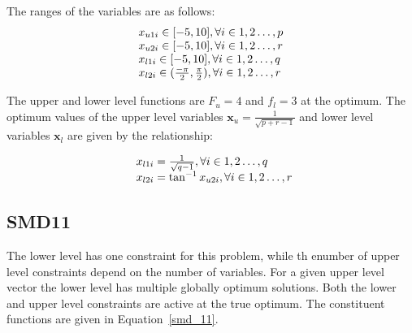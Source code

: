 The ranges of the variables are as follows:
\begin{equation}
\begin{array}{lr}
$$x_{u1i} \in  [-5,10],          \forall i \in {1,2\ldots,p}$$\\
$$x_{u2i} \in  [-5,10],          \forall i \in {1,2\ldots,r}$$\\
$$x_{l1i} \in  [-5,10],          \forall i \in {1,2\ldots,q}$$\\
$$x_{l2i} \in  (\frac{-\pi}{2},\frac{\pi}{2}),          \forall i \in {1,2\ldots,r}$$
\end{array}
\label{smd_10}
\end{equation}



The upper and lower level functions are $F_u=4$ and $f_l=3$  at the optimum. The optimum values of the upper level variables $\mathbf{x}_u=\frac{1}{\sqrt{p+r-1}}$ and lower level variables $\mathbf{x}_l$ are given by the relationship: 

\begin{equation}
\begin{array}{lr}
\text{}\hspace{2mm} x_{l1i}=\frac{1}{\sqrt{q-1}},  \forall i \in {1,2\ldots,q} \\
\text{}\hspace{2mm} x_{l2i}=\tan^{-1} x_{u2i} ,  \forall i \in {1,2\ldots,r} \\
\end{array}
\label{basic_10}
\end{equation}



\subsection{SMD11}

The lower level has one constraint for this problem, while th enumber of upper level constraints depend on the number of variables. For a given upper level vector the lower level has multiple globally optimum solutions. Both the lower and upper level constraints are active at the true optimum. The constituent functions are given in Equation~\ref{smd_11}.

